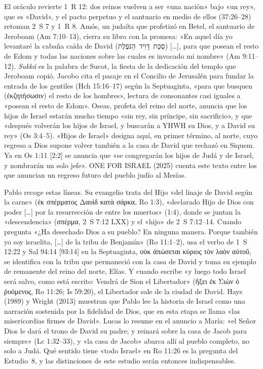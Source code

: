 \documentclass[11pt,letterpaper]{article}
\newcommand{\heb}[1]{\mbox{\foreignlanguage{hebrew}{#1}}}
\newcommand{\grc}[1]{\foreignlanguage{ancientgreek}{#1}}
\begin{document}
El oráculo revierte 1~R 12: dos reinos vuelven a ser «una nación» bajo «un rey», que es «David», y el pacto perpetuo y el santuario en medio de ellos (37:26--28) retoman 2~S 7 y 1~R 8. Amós, un judaíta que profetizó en Betel, el santuario de Jeroboam (Am 7:10--13), cierra su libro con la promesa: «En aquel día yo levantaré la cabaña caída de David (\heb{סֻכַּת דָּוִיד הַנֹּפֶלֶת}) [\ldots], para que posean el resto de Edom y todas las naciones sobre las cuales es invocado mi nombre» (Am 9:11--12). \emph{Sukká} es la palabra de Sucot, la fiesta de la dedicación del templo que Jeroboam copió. Jacobo cita el pasaje en el Concilio de Jerusalén para fundar la entrada de los gentiles (Hch 15:16--17) según la Septuaginta, «para que busquen (\grc{ἐκζητήσωσιν}) el resto de los hombres», lectura de consonantes casi iguales a «posean el resto de Edom». Oseas, profeta del reino del norte, anuncia que los hijos de Israel estarán mucho tiempo «sin rey, sin príncipe, sin sacrificio», y que «después volverán los hijos de Israel, y buscarán a YHWH su Dios, y a David su rey» (Os 3:4--5). «Hijos de Israel» designa aquí, en primer término, al norte, cuyo regreso a Dios supone volver también a la casa de David que rechazó en Siquem. Ya en Os 1:11 [2:2] se anuncia que «se congregarán los hijos de Judá y de Israel, y nombrarán un solo jefe». ONE FOR ISRAEL (2025) cuenta este texto entre los que anuncian un regreso futuro del pueblo judío al Mesías.

Pablo recoge estas líneas. Su evangelio trata del Hijo «del linaje de David según la carne» (\grc{ἐκ σπέρματος Δαυὶδ κατὰ σάρκα}, Ro 1:3), «declarado Hijo de Dios con poder [\ldots] por la resurrección de entre los muertos» (1:4), donde se juntan la «descendencia» (\grc{σπέρμα}, 2~S 7:12 LXX) y el «hijo» de 2~S 7:12--14. Cuando pregunta «¿Ha desechado Dios a su pueblo? En ninguna manera. Porque también yo soy israelita, [\ldots] de la tribu de Benjamín» (Ro 11:1--2), usa el verbo de 1~S 12:22 y Sal 94:14 [93:14] en la Septuaginta, \grc{οὐκ ἀπώσεται κύριος τὸν λαὸν αὐτοῦ}, se identifica con la tribu que permaneció con la casa de David y toma su ejemplo de remanente del reino del norte, Elías. Y cuando escribe «y luego todo Israel será salvo, como está escrito: Vendrá de Sion el Libertador» (\grc{ἥξει ἐκ Σιὼν ὁ ῥυόμενος}, Ro 11:26; Is 59:20), el Libertador sale de la ciudad de David. Hays (1989) y Wright (2013) muestran que Pablo lee la historia de Israel como una narración sostenida por la fidelidad de Dios, que en esta etapa se llama «las misericordias firmes de David». Lucas lo resume en el anuncio a María: «el Señor Dios le dará el trono de David su padre; y reinará sobre la casa de Jacob para siempre» (Lc 1:32--33), y «la casa de Jacob» abarca allí al pueblo completo, no solo a Judá. Qué sentido tiene «todo Israel» en Ro 11:26 es la pregunta del Estudio~8, y las distinciones de este estudio serán entonces indispensables.
\end{document}
